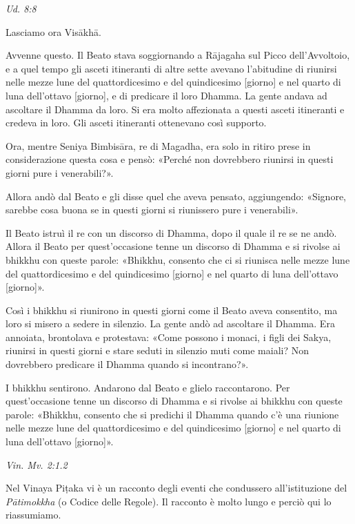 \emph{Ud. 8:8}


 Lasciamo ora Visākhā.


 Avvenne questo. Il Beato stava soggiornando a Rājagaha sul
Picco dell’Avvoltoio, e a quel tempo gli asceti itineranti di altre
sette avevano l’abitudine di riunirsi nelle mezze lune del
quattordicesimo e del quindicesimo [giorno] e nel quarto di luna
dell’ottavo [giorno], e di predicare il loro Dhamma. La gente andava ad
ascoltare il Dhamma da loro. Si era molto affezionata a questi asceti
itineranti e credeva in loro. Gli asceti itineranti ottenevano così
supporto.


Ora, mentre Seniya Bimbisāra, re di Magadha, era solo in ritiro prese in
considerazione questa cosa e pensò: «Perché non dovrebbero riunirsi in
questi giorni pure i venerabili?».


Allora andò dal Beato e gli disse quel che aveva pensato, aggiungendo:
«Signore, sarebbe cosa buona se in questi giorni si riunissero pure i
venerabili».


Il Beato istruì il re con un discorso di Dhamma, dopo il quale il re se
ne andò. Allora il Beato per quest’occasione tenne un discorso di Dhamma
e si rivolse ai bhikkhu con queste parole: «Bhikkhu, consento che ci si
riunisca nelle mezze lune del quattordicesimo e del quindicesimo
[giorno] e nel quarto di luna dell’ottavo [giorno]».


Così i bhikkhu si riunirono in questi giorni come il Beato aveva
consentito, ma loro si misero a sedere in silenzio. La gente andò ad
ascoltare il Dhamma. Era annoiata, brontolava e protestava: «Come
possono i monaci, i figli dei Sakya, riunirsi in questi giorni e stare
seduti in silenzio muti come maiali? Non dovrebbero predicare il Dhamma
quando si incontrano?».


I bhikkhu sentirono. Andarono dal Beato e glielo raccontarono. Per
quest’occasione tenne un discorso di Dhamma e si rivolse ai bhikkhu con
queste parole: «Bhikkhu, consento che si predichi il Dhamma quando c’è
una riunione nelle mezze lune del quattordicesimo e del quindicesimo
[giorno] e nel quarto di luna dell’ottavo [giorno]».


\emph{Vin. Mv. 2:1.2}


 Nel Vinaya Piṭaka vi è un racconto degli eventi che
condussero all’istituzione del \emph{Pātimokkha} (o Codice delle Regole). Il
racconto è molto lungo e perciò qui lo riassumiamo.



